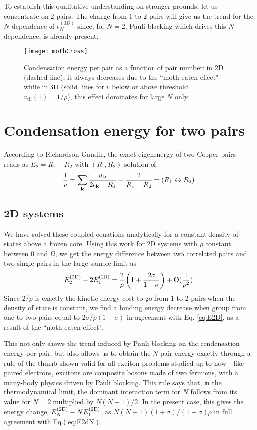 \documentclass[5p,twocolumn]{elsarticle}
\begin{document}
To establish this qualitative understanding on stronger  grounds, let us concentrate on  $2$ pairs. The change from 1 to 2 pairs will give us the trend for the $N$-dependence of $\epsilon^{(3D)}_N$ since, for $N=2$, Pauli blocking which drives this $N$-dependence, is already present.  

\begin{figure}[htb]
	\centering
		\texttt{[image: mothCross]}
	\caption{Condensation energy per pair as a function of pair number: in 2D (dashed line), it always decreases due to the ``moth-eaten effect" while in 3D (solid lines for  $v$ below or above threshold $v_{\text{th}}(1)=1/\rho$), this effect dominates for large $N$ only.}
	\label{fig:3dCondChange}
\end{figure}

\section{Condensation energy for two pairs\label{sec:twoPair}}
According to Richardson-Gaudin, the exact eigenenergy of two Cooper pairs reads as $E_2=R_1+R_2$ with $(R_1,R_2)$ solution of
\begin{equation}
\frac{1}{v}=\sum_{\mathbf{k}}\frac{w_{\mathbf{k}}}{2\epsilon_{\mathbf{k}}-R_1}+\frac{2}{R_1-R_2}=(R_{1}\leftrightarrow{}R_{2})
\label{eq:richardsonEq}
\end{equation}

\subsection{2D systems}
We have solved these coupled equations analytically for a constant density of states above a frozen core\cite{combescotBCS}.  Using  this work  for 2D systems with $\rho$ constant between $0$ and $\Omega$, we get the energy difference between two correlated pairs and two single pairs in the large sample limit as 
\begin{equation}
E^{{{\text{(2D)}}}}_2-2E_1^{{{\text{(2D)}}}}=\frac{2}{\rho}\left(1+\frac{2\sigma}{1-\sigma}\right)+\text{O}(\frac{1}{\rho^2})
\end{equation}
 Since $2/\rho$ is exactly the kinetic energy cost to go from 1 to 2 pairs when the density of state is constant, we find a binding energy decrease when group from one to two pairs equal to $2\sigma/\rho(1-\sigma)$ in agreement with Eq. \ref{eq:E2D}, as a result of the ``moth-eaten effect". 

This not only shows the trend induced by Pauli blocking on the condensation energy per pair, but also allows us to obtain the $N$-pair energy exactly through a rule of the thumb shown valid for all exciton problems studied up to now - like paired electrons, excitons are composite bosons made of two fermions, with a many-body physics driven by Pauli blocking.  This rule says that, in the thermodynamical limit, the dominant interaction term for $N$ follows from its value for $N= 2$ multiplied by $N(N-1)/2$.  In the present case, this gives the energy change, $E^{{{\text{(2D)}}}}_N-NE^{{{\text{(2D)}}}}_1$, as $N(N-1)(1+\sigma)/(1-\sigma)\rho$ in full agreement with
Eq.(\ref{eq:E2dN}).
\end{document}
